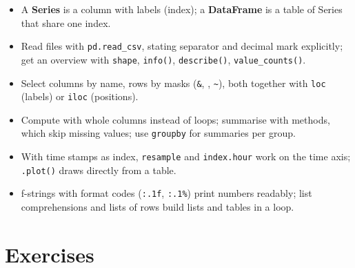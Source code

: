 \documentclass[
  letterpaper,
  DIV=11,
  numbers=noendperiod]{scrreprt}
\providecommand{\tightlist}{%
  \setlength{\itemsep}{0pt}\setlength{\parskip}{0pt}}\usepackage{longtable,booktabs,array}
\begin{document}

\begin{tcolorbox}[enhanced jigsaw, left=2mm, title=\textcolor{quarto-callout-important-color}{\faExclamation}\hspace{0.5em}{Key takeaways}, opacityback=0, breakable, rightrule=.15mm, arc=.35mm, toptitle=1mm, colbacktitle=quarto-callout-important-color!10!white, opacitybacktitle=0.6, coltitle=black, colframe=quarto-callout-important-color-frame, bottomrule=.15mm, leftrule=.75mm, bottomtitle=1mm, titlerule=0mm, toprule=.15mm, colback=white]

\begin{itemize}
\tightlist
\item
  A \textbf{Series} is a column with labels (index); a
  \textbf{DataFrame} is a table of Series that share one index.
\item
  Read files with \texttt{pd.read\_csv}, stating separator and decimal
  mark explicitly; get an overview with \texttt{shape}, \texttt{info()},
  \texttt{describe()}, \texttt{value\_counts()}.
\item
  Select columns by name, rows by masks (\texttt{\&},
  \texttt{\textbar{}}, \texttt{\textasciitilde{}}), both together with
  \texttt{loc} (labels) or \texttt{iloc} (positions).
\item
  Compute with whole columns instead of loops; summarise with methods,
  which skip missing values; use \texttt{groupby} for summaries per
  group.
\item
  With time stamps as index, \texttt{resample} and \texttt{index.hour}
  work on the time axis; \texttt{.plot()} draws directly from a table.
\item
  f-strings with format codes (\texttt{:.1f}, \texttt{:.1\%}) print
  numbers readably; list comprehensions and lists of rows build lists
  and tables in a loop.
\end{itemize}

\end{tcolorbox}

\section*{Exercises}\label{exercises}

\end{document}

